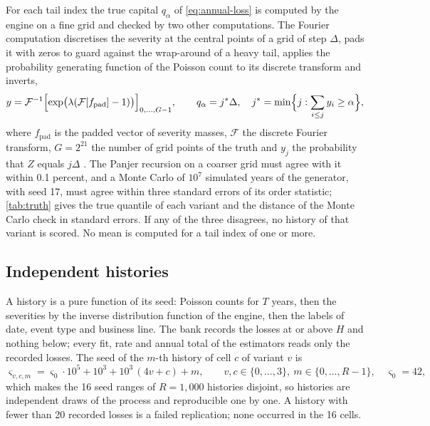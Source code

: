 For each tail index the true capital $q_\alpha$ of \cref{eq:annual-loss} is computed by the engine on a fine grid and checked by two other computations. The Fourier computation discretises the severity at the central points of a grid of step $\Delta$, pads it with zeros to guard against the wrap-around of a heavy tail, applies the probability
generating function of the Poisson count to its discrete transform and inverts,
\begin{equation}
y=\mathcal{F}^{-1}\Bigl[\exp\bigl(\lambda(\mathcal{F}[f_{\mathrm{pad}}]-1)\bigr)\Bigr]_{0,\dots,G-1},\qquad q_\alpha=j^\ast\Delta,\quad j^\ast=\min\Bigl\{j:\sum_{i\le j}y_i\ge\alpha\Bigr\},
\label{eq:fft-truth}
\end{equation}
where $f_{\mathrm{pad}}$ is the padded vector of severity masses, $\mathcal{F}$ the discrete Fourier transform, $G=2^{21}$ the number of grid points of the truth and $y_j$ the probability that $Z$ equals $j\Delta$ \citep{shevchenko2010}. The Panjer recursion \citep{panjer1981} on a coarser grid must agree with it within 0.1 percent,
and a Monte Carlo of $10^{7}$ simulated years of the generator, with seed 17, must agree within three standard errors of its order statistic; \cref{tab:truth} gives the true quantile of each variant and the distance of the Monte Carlo check in standard errors. If any of the three disagrees, no history of that variant is scored.
No mean is computed for a tail index of one or more.

\subsection{Independent histories}
\label{sec:pm-histories}

A history is a pure function of its seed: Poisson counts for $T$ years, then the severities by the inverse distribution function of the engine, then the labels of date, event type and business line. The bank records the losses at or above $H$ and nothing below; every fit, rate and annual total of the estimators reads only the recorded losses.
The seed of the $m$-th history of cell $c$ of variant $v$ is
\begin{equation}
\varsigma_{v,c,m}=\varsigma_0\cdot 10^{5}+10^{3}+10^{3}\,(4v+c)+m,\qquad v,c\in\{0,\dots,3\},\ m\in\{0,\dots,R-1\},\quad \varsigma_0=42,
\label{eq:seeds}
\end{equation}
which makes the 16 seed ranges of $R=1{,}000$ histories disjoint, so histories are independent draws of the process and reproducible one by one. A history with fewer than 20 recorded losses is a failed replication; none occurred in the 16 cells.

